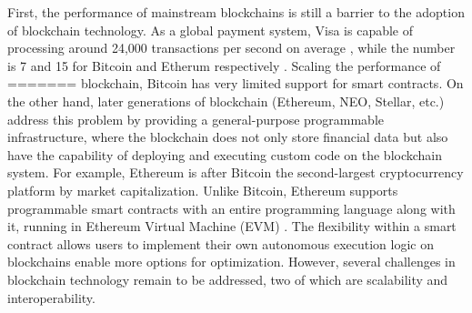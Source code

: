 First, the performance of mainstream blockchains is still a barrier to the
adoption of blockchain technology. As a global payment system, Visa is capable
of processing around 24,000 transactions per second on average \cite{visa},
while the number is 7 and 15 for Bitcoin and Etherum respectively
\cite{ethereum:sharding, nakamoto2019bitcoin}. Scaling the performance of
=======
blockchain, Bitcoin has very limited support for smart contracts. On the other
hand, later generations of blockchain (Ethereum, NEO, Stellar, etc.) address
this problem by providing a general-purpose programmable infrastructure, where
the blockchain does not only store financial data but also have the capability
of deploying and executing custom code on the blockchain system. For example,
Ethereum is after Bitcoin the second-largest cryptocurrency platform by market
capitalization. Unlike Bitcoin, Ethereum supports programmable smart contracts
with an entire programming language along with it, running in Ethereum Virtual
Machine (EVM) \cite{ethereum:evm}. The flexibility within a smart contract
allows users to implement their own autonomous execution logic on blockchains
enable more options for optimization. However, several challenges in blockchain
technology remain to be addressed, two of which are scalability and
interoperability.

